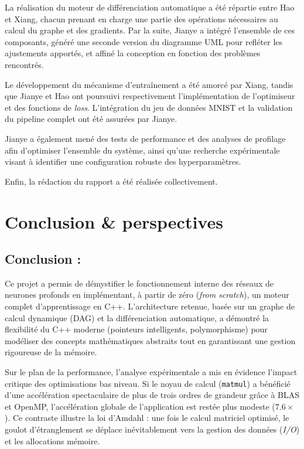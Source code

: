 \documentclass[a4paper,11pt]{article}
\begin{document}
La réalisation du moteur de différenciation automatique a été répartie entre Hao et Xiang, chacun prenant en charge une partie des opérations nécessaires au calcul du graphe et des gradients. Par la suite, Jianye a intégré l'ensemble de ces composants, généré une seconde version du diagramme UML pour refléter les ajustements apportés, et affiné la conception en fonction des problèmes rencontrés.

Le développement du mécanisme d'entraînement a été amorcé par Xiang, tandis que Jianye et Hao ont poursuivi respectivement l'implémentation de l'optimiseur et des fonctions de \textit{loss}. L'intégration du jeu de données MNIST et la validation du pipeline complet ont été assurées par Jianye.

Jianye a également mené des tests de performance et des analyses de profilage afin d'optimiser l'ensemble du système, ainsi qu'une recherche expérimentale visant à identifier une configuration robuste des hyperparamètres.

Enfin, la rédaction du rapport a été réalisée collectivement.

\section{Conclusion \& perspectives}

\subsection{Conclusion :}
Ce projet a permis de démystifier le fonctionnement interne des réseaux de neurones profonds en implémentant, à partir de zéro (\textit{from scratch}), un moteur complet d'apprentissage en C++. L'architecture retenue, basée sur un graphe de calcul dynamique (DAG) et la différenciation automatique, a démontré la flexibilité du C++ moderne (pointeurs intelligents, polymorphisme) pour modéliser des concepts mathématiques abstraits tout en garantissant une gestion rigoureuse de la mémoire.

Sur le plan de la performance, l'analyse expérimentale a mis en évidence l'impact critique des optimisations bas niveau. Si le noyau de calcul (\texttt{matmul}) a bénéficié d'une accélération spectaculaire de plus de trois ordres de grandeur grâce à BLAS et OpenMP, l'accélération globale de l'application est restée plus modeste ($7.6\times$). Ce contraste illustre la loi d'Amdahl : une fois le calcul matriciel optimisé, le goulot d'étranglement se déplace inévitablement vers la gestion des données (\textit{I/O}) et les allocations mémoire.
\end{document}
